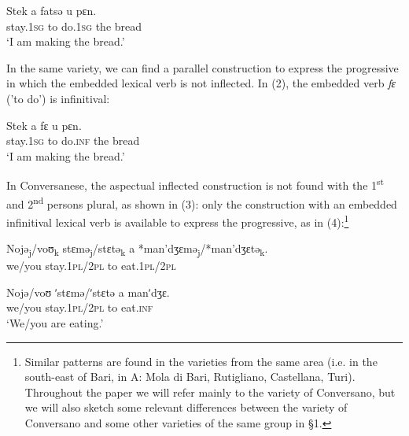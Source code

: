 \documentclass[output=paper]{langsci/langscibook}
\begin{document}
\ea%
    \label{ex:lorusso:1}
    \gll Stek    a   fatsə    u    pɛn.     \\
         stay.\textsc{1sg}   to  do.\textsc{1sg} the    bread\\
    \glt ‘I am making the bread.’
    \z


In the same variety, we can find a parallel construction to express the progressive in which the embedded lexical verb is not inflected. In (2), the embedded verb \textit{fɛ} ('to do') is infinitival: 

\ea%
    \label{ex:lorusso:2}
    \gll Stek     a  fɛ     u    pɛn.      \\
         stay.\textsc{1sg} to   do.\textsc{inf}    the    bread\\
    \glt ‘I am making the bread.’
    \z

In Conversanese, the aspectual inflected construction is not found with the 1\textsuperscript{st} and 2\textsuperscript{nd} persons plural, as shown in (3): only the construction with an embedded infinitival lexical verb is available to express the progressive, as in (4):\footnote{Similar patterns are found in the varieties from the same area (i.e. in the south-east of Bari, in A: Mola di Bari, Rutigliano, Castellana, Turi). Throughout the paper we will refer mainly to the variety of Conversano, but we will also sketch some relevant differences between the variety of Conversano and some other varieties of the same group in §1.}

\ea%
    \label{ex:lorusso:3}
    \gll Nojə\textsubscript{j}/voʊ\textsubscript{k}   stɛmə\textsubscript{j}/stɛtə\textsubscript{k}   a   *man’dʒɛmə\textsubscript{j}/*man’dʒɛtə\textsubscript{k}.\\
         we/you  stay.\textsc{1pl}/\textsc{2pl} to   eat.\textsc{1pl}/\textsc{2pl} \\
    \z


\ea%
    \label{ex:lorusso:4}
    \gll Nojə/voʊ   ʹstɛmə/ʹstɛtə   a  manʹdʒɛ.\\
         we/you   stay.\textsc{1pl}/\textsc{2pl} to   eat.\textsc{inf}\\
    \glt ‘We/you are eating.’
    \z
\end{document}
